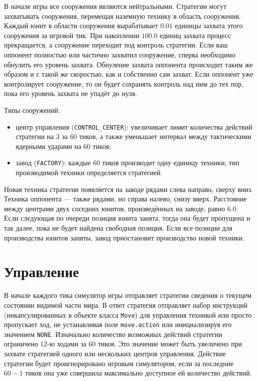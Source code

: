 В начале игры все сооружения являются нейтральными. Стратегии могут захватывать сооружения, перемещая наземную технику в область сооружения.
Каждый юнит в области сооружения вырабатывает $0.01$ единицы захвата этого сооружения за игровой тик. При накоплении $100.0$ единиц захвата
процесс прекращается, а сооружение переходит под контроль стратегии. Если ваш оппонент полностью или частично захватил сооружение, сперва
необходимо обнулить его уровень захвата. Обнуление захвата оппонента происходит таким же образом и с такой же скоростью, как и собственно
сам захват. Если оппонент уже контролирует сооружение, то он будет сохранять контроль над ним до тех пор, пока его уровень захвата не упадёт
до нуля.

Типы сооружений:
\begin{itemize}
    \item центр управления (\texttt{CONTROL\_CENTER}): увеличивает лимит количества действий стратегии на $3$ за $60$ тиков, а также
          уменьшает интервал между тактическими ядерными ударами на $60$ тиков;
    \item завод (\texttt{FACTORY}): каждые $60$ тиков производит одну единицу техники, тип производимой техники определяется стратегией.
\end{itemize}

Новая техника стратегии появляется на заводе рядами слева направо, сверху вниз. Техника оппонента --- также рядами, но справа налево, снизу
вверх. Расстояние между центрами двух соседних юнитов, произведённых на заводе, равно $6.0$. Если следующая по очереди позиция юнита занята,
тогда она будет пропущена и так далее, пока не будет найдена свободная позиция. Если все позиции для производства юнитов заняты, завод
приостановит производство новой техники.

\section{Управление}

В начале каждого тика симулятор игры отправляет стратегии сведения о текущем состоянии видимой части мира. В ответ стратегия отправляет
набор инструкций (инкапсулированных в объекте класса \texttt{Move}) для управления техникой или просто пропускает ход, не устанавливая поле
\texttt{move.action} или инициализируя его значением \texttt{NONE}. Изначально количество возможных действий стратегии ограничено $12$-ю
ходами за $60$ тиков. Это значение может быть увеличено при захвате стратегией одного или нескольких центров управления. Действие стратегии
будет проигнорировано игровым симулятором, если за последние $60 - 1$ тиков она уже совершила максимально доступное ей количество действий.

